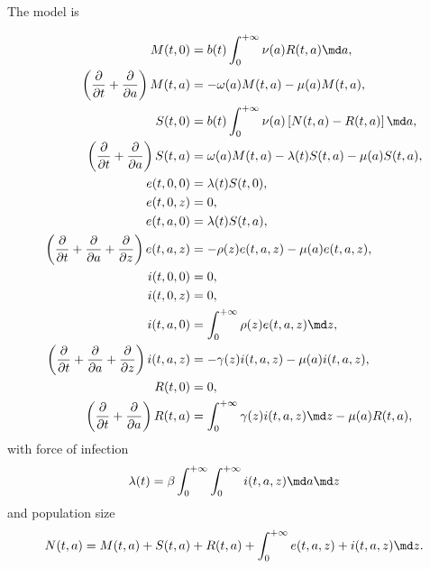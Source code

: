 \documentclass{jpmarticle}
\let\subequationsorig\subequations%
\let\endsubequationsorig\endsubequations%
\renewenvironment{subequations}{
  \subequationsorig
  \renewcommand{\theequation}{\theparentequation.\arabic{equation}}
}{
  \endsubequationsorig
}
\begin{document}
The model is
\begin{subequations}
  \label{model_age_and_time_since_entry_structured}
  \begin{align}
    M(t, 0) &=
    b(t) \int_0^{+\infty} \nu(a) R(t, a) \md a,
    \\
    \left(\frac{\partial}{\partial t}
      + \frac{\partial}{\partial a}\right)
    M(t, a) &=
    - \omega(a) M(t, a) - \mu(a) M(t, a),
    \\
    S(t, 0) &=
    b(t) \int_0^{+\infty} \nu(a) \left[N(t, a) - R(t, a)\right] \md a,
    \\
    \left(\frac{\partial}{\partial t}
      + \frac{\partial}{\partial a}\right)
    S(t, a) &=
    \omega(a) M(t, a) - \lambda(t) S(t, a) - \mu(a) S(t, a),
    \\
    e(t, 0, 0) &=
    \lambda(t) S(t, 0),
    \\
    e(t, 0, z) &=
    0,
    \\
    e(t, a, 0) &=
    \lambda(t) S(t, a),
    \\
    \left(\frac{\partial}{\partial t}
      + \frac{\partial}{\partial a}
      + \frac{\partial}{\partial z}\right)
    e(t, a, z) &=
    - \rho(z) e(t, a, z) - \mu(a) e(t, a, z),
    \\
    i(t, 0, 0) &=
    0,
    \\
    i(t, 0, z) &=
    0,
    \\
    i(t, a, 0) &=
    \int_0^{+\infty} \rho(z) e(t, a, z) \md z,
    \\
    \left(\frac{\partial}{\partial t}
      + \frac{\partial}{\partial a}
      + \frac{\partial}{\partial z}\right)
    i(t, a, z) &=
    - \gamma(z) i(t, a, z) - \mu(a) i(t, a, z),
    \\
    R(t, 0) &=
    0,
    \\
    \left(\frac{\partial}{\partial t}
      + \frac{\partial}{\partial a}\right)
    R(t, a) &=
    \int_0^{+\infty} \gamma(z) i(t, a, z) \md z
    - \mu(a) R(t, a),
  \end{align}
  with force of infection
  \begin{equation}
    \lambda(t) =
    \beta
    \int_0^{+\infty} \int_0^{+\infty}
    i(t, a, z)
    \md a \md z
  \end{equation}
  and population size
  \begin{equation}
    N(t, a) =
    M(t, a) + S(t, a) + R(t, a)
    + \int_0^{+\infty} e(t, a, z) + i(t, a, z) \md z.
  \end{equation}
\end{subequations}
\end{document}
